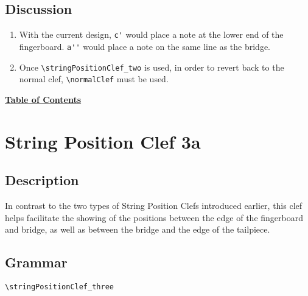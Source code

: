 \subsection{Discussion}
\begin{enumerate}
\item With the current design, \verb|c'| would place a note at the lower end of the fingerboard. \verb|a''| would place a note on the same line as the bridge. 

\item Once \verb|\stringPositionClef_two| is used, in order to revert back to the normal clef, \verb|\normalClef| must be used.
\end{enumerate}

\hyperref[sec:toc]{\textbf{Table of Contents}}

\vfill \break




\label{sec:StringPositionClef3a}
\section {String Position Clef 3a}
\hfill
{}
\hfill

\subsection{Description}
In contrast to the two types of String Position Clefs introduced earlier, this clef helps facilitate the showing of the positions between the edge of the fingerboard and bridge, as well as between the bridge and the edge of the tailpiece. 

\subsection{Grammar}
\begin{verbatim}
\stringPositionClef_three 
\end{verbatim}
